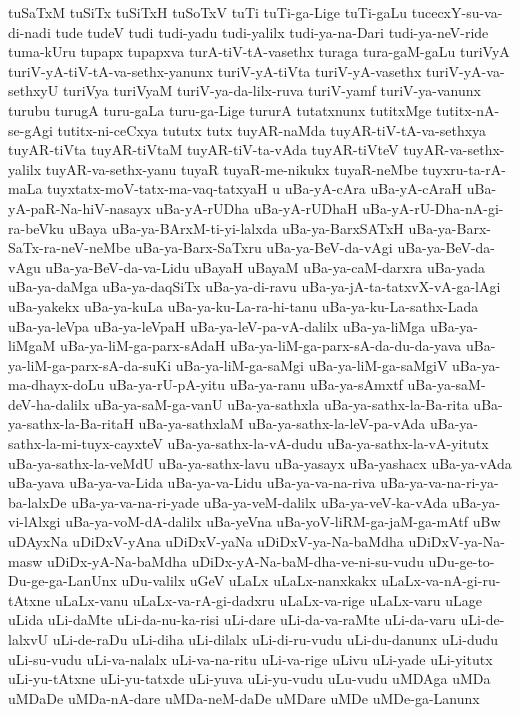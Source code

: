 {tuSaTxM
tuSiTx
tuSiTxH
tuSoTxV
tuTi
tuTi-ga-Lige
tuTi-gaLu
tucecxY-su-va-di-nadi
tude
tudeV
tudi
tudi-yadu
tudi-yalilx
tudi-ya-na-Dari
tudi-ya-neV-ride
tuma-kUru
tupapx
tupapxva
turA-tiV-tA-vasethx
turaga
tura-gaM-gaLu
turiVyA
turiV-yA-tiV-tA-va-sethx-yanunx
turiV-yA-tiVta
turiV-yA-vasethx
turiV-yA-va-sethxyU
turiVya
turiVyaM
turiV-ya-da-lilx-ruva
turiV-yamf
turiV-ya-vanunx
turubu
turugA
turu-gaLa
turu-ga-Lige
tururA
tutatxnunx
tutitxMge
tutitx-nA-se-gAgi
tutitx-ni-ceCxya
tututx
tutx
tuyAR-naMda
tuyAR-tiV-tA-va-sethxya
tuyAR-tiVta
tuyAR-tiVtaM
tuyAR-tiV-ta-vAda
tuyAR-tiVteV
tuyAR-va-sethx-yalilx
tuyAR-va-sethx-yanu
tuyaR
tuyaR-me-nikukx
tuyaR-neMbe
tuyxru-ta-rA-maLa
tuyxtatx-moV-tatx-ma-vaq-tatxyaH
u
uBa-yA-cAra
uBa-yA-cAraH
uBa-yA-paR-Na-hiV-nasayx
uBa-yA-rUDha
uBa-yA-rUDhaH
uBa-yA-rU-Dha-nA-gi-ra-beVku
uBaya
uBa-ya-BArxM-ti-yi-lalxda
uBa-ya-BarxSATxH
uBa-ya-Barx-SaTx-ra-neV-neMbe
uBa-ya-Barx-SaTxru
uBa-ya-BeV-da-vAgi
uBa-ya-BeV-da-vAgu
uBa-ya-BeV-da-va-Lidu
uBayaH
uBayaM
uBa-ya-caM-darxra
uBa-yada
uBa-ya-daMga
uBa-ya-daqSiTx
uBa-ya-di-ravu
uBa-ya-jA-ta-tatxvX-vA-ga-lAgi
uBa-yakekx
uBa-ya-kuLa
uBa-ya-ku-La-ra-hi-tanu
uBa-ya-ku-La-sathx-Lada
uBa-ya-leVpa
uBa-ya-leVpaH
uBa-ya-leV-pa-vA-dalilx
uBa-ya-liMga
uBa-ya-liMgaM
uBa-ya-liM-ga-parx-sAdaH
uBa-ya-liM-ga-parx-sA-da-du-da-yava
uBa-ya-liM-ga-parx-sA-da-suKi
uBa-ya-liM-ga-saMgi
uBa-ya-liM-ga-saMgiV
uBa-ya-ma-dhayx-doLu
uBa-ya-rU-pA-yitu
uBa-ya-ranu
uBa-ya-sAmxtf
uBa-ya-saM-deV-ha-dalilx
uBa-ya-saM-ga-vanU
uBa-ya-sathxla
uBa-ya-sathx-la-Ba-rita
uBa-ya-sathx-la-Ba-ritaH
uBa-ya-sathxlaM
uBa-ya-sathx-la-leV-pa-vAda
uBa-ya-sathx-la-mi-tuyx-cayxteV
uBa-ya-sathx-la-vA-dudu
uBa-ya-sathx-la-vA-yitutx
uBa-ya-sathx-la-veMdU
uBa-ya-sathx-lavu
uBa-yasayx
uBa-yashacx
uBa-ya-vAda
uBa-yava
uBa-ya-va-Lida
uBa-ya-va-Lidu
uBa-ya-va-na-riva
uBa-ya-va-na-ri-ya-ba-lalxDe
uBa-ya-va-na-ri-yade
uBa-ya-veM-dalilx
uBa-ya-veV-ka-vAda
uBa-ya-vi-lAlxgi
uBa-ya-voM-dA-dalilx
uBa-yeVna
uBa-yoV-liRM-ga-jaM-ga-mAtf
uBw
uDAyxNa
uDiDxV-yAna
uDiDxV-yaNa
uDiDxV-ya-Na-baMdha
uDiDxV-ya-Na-masw
uDiDx-yA-Na-baMdha
uDiDx-yA-Na-baM-dha-ve-ni-su-vudu
uDu-ge-to-Du-ge-ga-LanUnx
uDu-valilx
uGeV
uLaLx
uLaLx-nanxkakx
uLaLx-va-nA-gi-ru-tAtxne
uLaLx-vanu
uLaLx-va-rA-gi-dadxru
uLaLx-va-rige
uLaLx-varu
uLage
uLida
uLi-daMte
uLi-da-nu-ka-risi
uLi-dare
uLi-da-va-raMte
uLi-da-varu
uLi-de-lalxvU
uLi-de-raDu
uLi-diha
uLi-dilalx
uLi-di-ru-vudu
uLi-du-danunx
uLi-dudu
uLi-su-vudu
uLi-va-nalalx
uLi-va-na-ritu
uLi-va-rige
uLivu
uLi-yade
uLi-yitutx
uLi-yu-tAtxne
uLi-yu-tatxde
uLi-yuva
uLi-yu-vudu
uLu-vudu
uMDAga
uMDa
uMDaDe
uMDa-nA-dare
uMDa-neM-daDe
uMDare
uMDe
uMDe-ga-Lanunx
}
